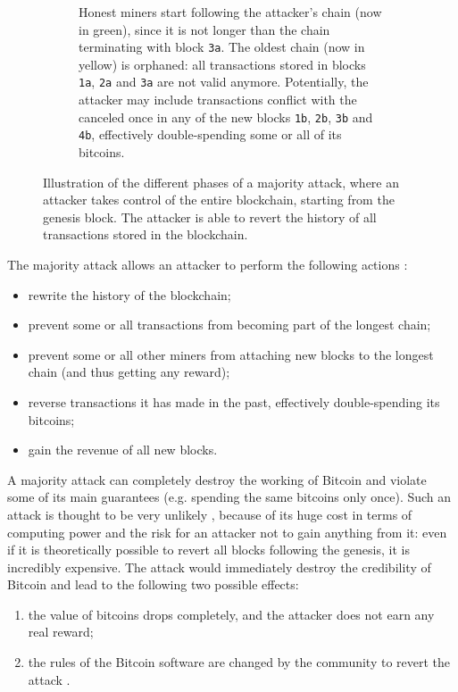 \begin{figure}[t!]
\begin{subfigure}{\textwidth}
		\vspace*{0.25cm}
		\caption{
			Honest miners start following the attacker's chain (now in green), since it is not longer than the chain terminating with block \texttt{3a}.
			The oldest chain (now in yellow) is orphaned: all transactions stored in blocks \texttt{1a}, \texttt{2a} and \texttt{3a} are not valid anymore.
			Potentially, the attacker may include transactions conflict with the canceled once in any of the new blocks \texttt{1b}, \texttt{2b}, \texttt{3b} and \texttt{4b}, effectively double-spending some or all of its bitcoins.
		}
		\vspace*{0.25cm}
	\end{subfigure}
	\caption[Illustration of the different phases of a majority attack]{
		Illustration of the different phases of a majority attack, where an attacker takes control of the entire blockchain, starting from the genesis block.
		The attacker is able to revert the history of all transactions stored in the blockchain.
	}
	\label{fig:majority-attack}
\end{figure}

The majority attack allows an attacker to perform the following actions \cite{weaknesses_bitcoin_wiki}:
\begin{itemize}
	\item rewrite the history of the blockchain;
	\item prevent some or all transactions from becoming part of the longest chain;
	\item prevent some or all other miners from attaching new blocks to the longest chain (and thus getting any reward);
	\item reverse transactions it has made in the past, effectively double-spending its bitcoins;
	\item gain the revenue of all new blocks.
\end{itemize}

A majority attack can completely destroy the working of Bitcoin and violate some of its main guarantees (e.g. spending the same bitcoins only once).
Such an attack is thought to be very unlikely \cite{ghash_never_51_attack_cex, ghash_never_51_attack_coindesk}, because of its huge cost in terms of computing power and the risk for an attacker not to gain anything from it:
even if it is theoretically possible to revert all blocks following the genesis, it is incredibly expensive.
The attack would immediately destroy the credibility of Bitcoin and lead to the following two possible effects:
\begin{enumerate}
	\item the value of bitcoins drops completely, and the attacker does not earn any real reward;
	\item the rules of the Bitcoin software are changed by the community to revert the attack \cite{weaknesses_bitcoin_wiki}.
\end{enumerate}


